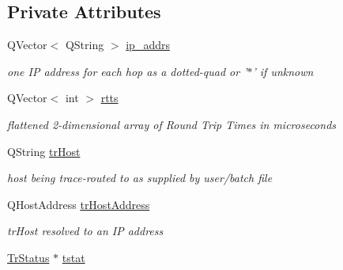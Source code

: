 \subsection*{Private Attributes}
\begin{CompactItemize}
\item 
\hypertarget{classTrWorkItem_3beaba00037ffa9044bca8b2f0a555eb}{
QVector$<$ QString $>$ \hyperlink{classTrWorkItem_3beaba00037ffa9044bca8b2f0a555eb}{ip\_\-addrs}}
\label{classTrWorkItem_3beaba00037ffa9044bca8b2f0a555eb}

\begin{CompactList}\small\item\em one IP address for each hop as a dotted-quad or '$\ast$' if unknown \item\end{CompactList}\item 
\hypertarget{classTrWorkItem_ce2535ad8bbfedc141dc22926c496dfa}{
QVector$<$ int $>$ \hyperlink{classTrWorkItem_ce2535ad8bbfedc141dc22926c496dfa}{rtts}}
\label{classTrWorkItem_ce2535ad8bbfedc141dc22926c496dfa}

\begin{CompactList}\small\item\em flattened 2-dimensional array of Round Trip Times in microseconds \item\end{CompactList}\item 
\hypertarget{classTrWorkItem_661a2813b20b2b65ddc5de5b155e1b49}{
QString \hyperlink{classTrWorkItem_661a2813b20b2b65ddc5de5b155e1b49}{trHost}}
\label{classTrWorkItem_661a2813b20b2b65ddc5de5b155e1b49}

\begin{CompactList}\small\item\em host being trace-routed to as supplied by user/batch file \item\end{CompactList}\item 
\hypertarget{classTrWorkItem_80fa4a969af4cfcba111a0b8e7fc484b}{
QHostAddress \hyperlink{classTrWorkItem_80fa4a969af4cfcba111a0b8e7fc484b}{trHostAddress}}
\label{classTrWorkItem_80fa4a969af4cfcba111a0b8e7fc484b}

\begin{CompactList}\small\item\em trHost resolved to an IP address \item\end{CompactList}\item 
\hypertarget{classTrWorkItem_4270cd5b74c069865aff5881900ff307}{
\hyperlink{classTrStatus}{TrStatus} $\ast$ \hyperlink{classTrWorkItem_4270cd5b74c069865aff5881900ff307}{tstat}}
\label{classTrWorkItem_4270cd5b74c069865aff5881900ff307}


\end{CompactItemize}
